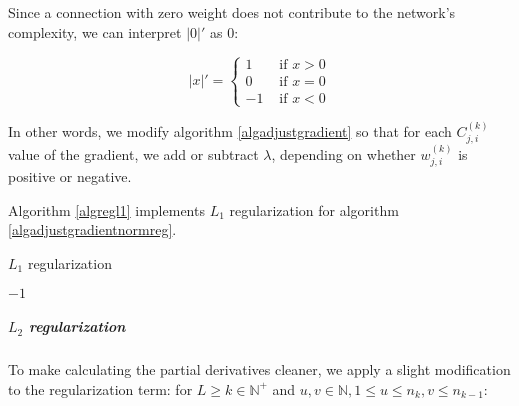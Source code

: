\documentclass{article}
\begin{document}
            Since a connection with zero weight does not contribute to the
            network's complexity, we can interpret $|0|'$ as $0$:

            \begin{equation}
              |x|' =
                \begin{cases}
                  1 & \text{ if } x > 0 \\
                  0 & \text{ if } x = 0 \\
                  -1 & \text{ if } x < 0
                \end{cases}
            \end{equation}

            In other words, we modify algorithm \ref{algadjustgradient} so that
            for each $C_{j,i}^{(k)}$ value of the gradient, we add or subtract
            $\lambda$, depending on whether $w_{j,i}^{(k)}$ is positive or
            negative.

            Algorithm \ref{algregl1} implements $L_1$ regularization for
            algorithm \ref{algadjustgradientnormreg}.

            \begin{algorithm}
              \caption{$L_1$ regularization} \label{algregl1}
              \begin{algorithmic}
                    \State {}
                  \EndIf

                    \State {}
                  \EndIf

                  \State \Return $-1$
                \EndFunction
              \end{algorithmic}
            \end{algorithm}

          \subparagraph{$L_2$ regularization}

            To make calculating the partial derivatives cleaner, we apply a
            slight modification to the regularization term: for
            $L \geq k \in \mathbb{N}^+$ and
            $u, v \in \mathbb{N}, 1 \leq u \leq n_k, v \leq n_{k - 1}$:
\end{document}

